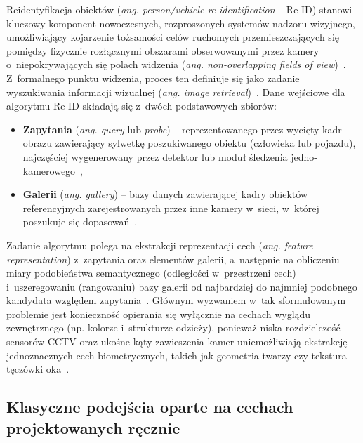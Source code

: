 Reidentyfikacja obiektów (\textit{ang. person/vehicle re-identification} -- Re-ID) stanowi kluczowy
komponent nowoczesnych, rozproszonych systemów nadzoru wizyjnego, umożliwiający kojarzenie
tożsamości celów ruchomych przemieszczających się pomiędzy fizycznie rozłącznymi obszarami
obserwowanymi przez kamery o~niepokrywających się polach widzenia (\textit{ang. non-overlapping
  fields of view})~\cite{ristani2016, zheng2016person}. Z~formalnego punktu widzenia, proces ten
definiuje się jako zadanie wyszukiwania informacji wizualnej (\textit{ang. image
  retrieval})~\cite{zheng2016person}. Dane wejściowe dla algorytmu Re-ID składają się z~dwóch
podstawowych zbiorów:
\begin{itemize}
  \item \textbf{Zapytania} (\textit{ang. query} lub \textit{probe}) -- reprezentowanego przez wycięty kadr obrazu zawierający sylwetkę poszukiwanego obiektu (człowieka lub pojazdu), najczęściej wygenerowany przez detektor lub moduł śledzenia jedno-kamerowego~\cite{ristani2016, zheng2016person},
  \item \textbf{Galerii} (\textit{ang. gallery}) -- bazy danych zawierającej kadry obiektów referencyjnych zarejestrowanych przez inne kamery w~sieci, w~której poszukuje się dopasowań~\cite{zheng2016person}.
\end{itemize}
Zadanie algorytmu polega na ekstrakcji reprezentacji cech (\textit{ang. feature representation}) z~zapytania oraz elementów galerii, a~następnie na obliczeniu miary podobieństwa semantycznego (odległości w~przestrzeni cech) i~uszeregowaniu (rangowaniu) bazy galerii od najbardziej do najmniej podobnego kandydata względem zapytania~\cite{zheng2016person}. Głównym wyzwaniem w~tak sformułowanym problemie jest konieczność opierania się wyłącznie na cechach wyglądu zewnętrznego (np. kolorze i~strukturze odzieży), ponieważ niska rozdzielczość sensorów CCTV oraz ukośne kąty zawieszenia kamer uniemożliwiają ekstrakcję jednoznacznych cech biometrycznych, takich jak geometria twarzy czy tekstura tęczówki oka~\cite{ristani2016, zheng2016person}.

\subsection{Klasyczne podejścia oparte na cechach projektowanych ręcznie}
\label{subsec:hand_crafted_reid}

